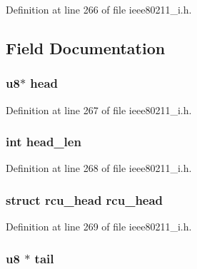 Definition at line 266 of file ieee80211\-\_\-i.\-h.



\subsection{Field Documentation}
\hypertarget{structbeacon__data_a88a17ac21eb16e4d6d10b556a019aa14}{
\subsubsection[{head}]{\setlength{\rightskip}{0pt plus 5cm}u8$\ast$ head}}\label{structbeacon__data_a88a17ac21eb16e4d6d10b556a019aa14}


Definition at line 267 of file ieee80211\-\_\-i.\-h.

\hypertarget{structbeacon__data_a60f685cd83e38123312aed3f02c63646}{
\subsubsection[{head\-\_\-len}]{\setlength{\rightskip}{0pt plus 5cm}int head\-\_\-len}}\label{structbeacon__data_a60f685cd83e38123312aed3f02c63646}


Definition at line 268 of file ieee80211\-\_\-i.\-h.

\hypertarget{structbeacon__data_ab698383409a24791490f962fe6990655}{
\subsubsection[{rcu\-\_\-head}]{\setlength{\rightskip}{0pt plus 5cm}struct rcu\-\_\-head rcu\-\_\-head}}\label{structbeacon__data_ab698383409a24791490f962fe6990655}


Definition at line 269 of file ieee80211\-\_\-i.\-h.

\hypertarget{structbeacon__data_a4474db8b875e66d6e97dad3d131e0259}{
\subsubsection[{tail}]{\setlength{\rightskip}{0pt plus 5cm}u8 $\ast$ tail}}\label{structbeacon__data_a4474db8b875e66d6e97dad3d131e0259}


